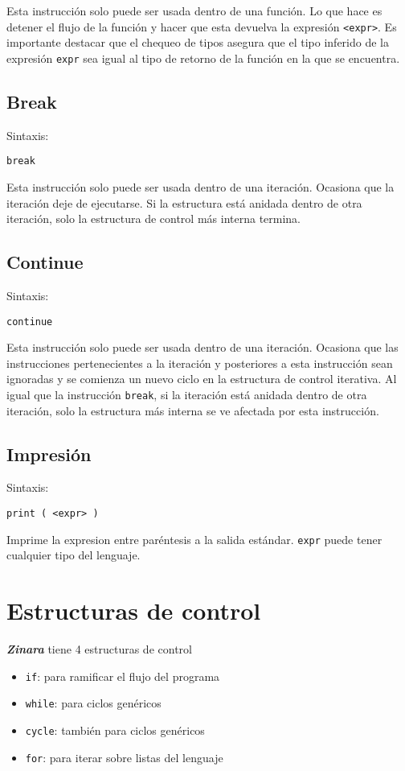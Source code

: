 \documentclass[12pt, spanish]{report}
\begin{document}
Esta instrucci\'on solo puede ser usada dentro de una funci\'on. Lo
que hace es detener el flujo de la funci\'on y hacer que esta devuelva
la expresi\'on \texttt{<expr>}. Es importante destacar que el chequeo
de tipos asegura que el tipo inferido de la expresi\'on \texttt{expr}
sea igual al tipo de retorno de la funci\'on en la que se encuentra.

\section{Break}
\label{sec:return}
Sintaxis:
\begin{verbatim}
break
\end{verbatim}

Esta instrucci\'on solo puede ser usada dentro de una
iteraci\'on. Ocasiona que la iteraci\'on deje de ejecutarse.
Si la estructura est\'a anidada dentro de otra iteraci\'on,
solo la estructura de control m\'as interna termina.

\section{Continue}
\label{sec:return}
Sintaxis:
\begin{verbatim}
continue
\end{verbatim}

Esta instrucci\'on solo puede ser usada dentro de una
iteraci\'on. Ocasiona que las instrucciones pertenecientes a la
iteraci\'on y posteriores a esta instrucci\'on sean ignoradas y se
comienza un nuevo ciclo en la estructura de control iterativa.  Al
igual que la instrucci\'on \texttt{break}, si la iteraci\'on est\'a
anidada dentro de otra iteraci\'on, solo la estructura m\'as interna
se ve afectada por esta instrucci\'on.

\section{Impresi\'on}
Sintaxis:
\begin{verbatim}
print ( <expr> )
\end{verbatim}

Imprime la expresion entre par\'entesis a la salida
est\'andar. \texttt{expr} puede tener cualquier tipo del lenguaje.

\chapter{Estructuras de control}
\label{sec:ecntrl}
\emph{\textbf{Zinara}} tiene 4 estructuras de control
\begin{itemize}
\item \texttt{if}: para ramificar el flujo del programa
\item \texttt{while}: para ciclos gen\'ericos
\item \texttt{cycle}: tambi\'en para ciclos gen\'ericos
\item \texttt{for}: para iterar sobre listas del lenguaje
\end{itemize}
\end{document}
